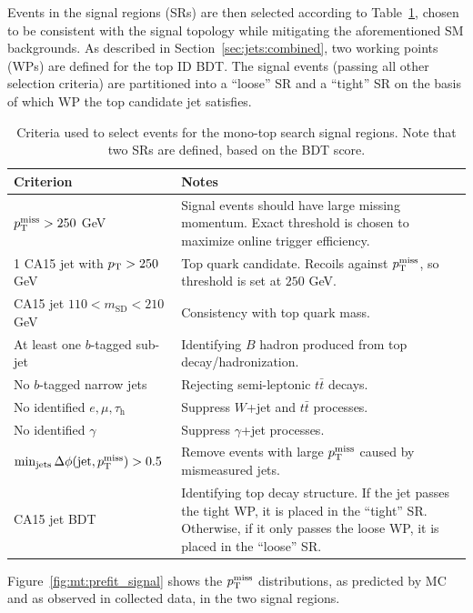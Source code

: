 Events in the signal regions (SRs) are then selected according to Table~\ref{tab:mt:cuts}, chosen to be consistent with the signal topology while mitigating the aforementioned SM backgrounds.
As described in Section~\ref{sec:jets:combined}, two working points (WPs) are defined for the top ID BDT.
The signal events (passing all other selection criteria) are partitioned into a ``loose'' SR and a ``tight'' SR on the basis of which WP the top candidate jet satisfies. 

\begin{table}[]
    \caption{Criteria used to select events for the mono-top search signal regions. Note that two SRs are defined, based on the BDT score.}
    \label{tab:mt:cuts}
    \begin{tabular}{p{}p{}}
        Criterion & Notes \\ 
        \hline 
        \hline 
        $p_\mathrm{T}^\mathrm{miss}>250$ GeV & Signal events should have large missing momentum. Exact threshold is chosen to maximize online trigger efficiency. \\ 
        1 CA15 jet with $p_\mathrm{T}>250$ GeV & Top quark candidate. Recoils against $p_\mathrm{T}^\mathrm{miss}$, so threshold is set at $250$ GeV. \\ 
        CA15 jet $110 < m_\mathrm{SD} < 210$ GeV & Consistency with top quark mass. \\ 
        At least one $b$-tagged sub-jet & Identifying $B$ hadron produced from top decay/hadronization. \\ 
        No $b$-tagged narrow jets & Rejecting semi-leptonic $t\bar{t}$ decays. \\ 
        \hline 
        No identified $e,\mu,\tau_\mathrm{h}$ & Suppress $W$+jet and $t\bar{t}$ processes. \\ 
        No identified $\gamma$ & Suppress $\gamma$+jet processes. \\ 
        \hline 
        $\min_\mathrm{jets}\Delta\phi(\mathrm{jet},p_\mathrm{T}^\mathrm{miss}) > 0.5$ & Remove events with large $p_\mathrm{T}^\mathrm{miss}$ caused by mismeasured jets. \\ 
        \hline 
        CA15 jet BDT & Identifying top decay structure. If the jet passes the tight WP, it is placed in the ``tight'' SR. Otherwise, if it only passes the loose WP, it is placed in the ``loose'' SR.\\ 
    \end{tabular}
\end{table}

Figure~\ref{fig:mt:prefit_signal} shows the $p_\mathrm{T}^\mathrm{miss}$ distributions, as predicted by MC and as observed in collected data, in the two signal regions.

